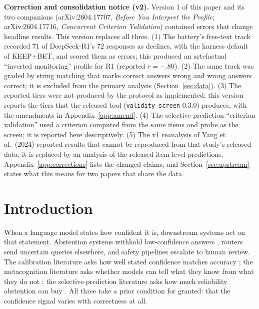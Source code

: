 \documentclass[11pt,a4paper]{article}
\begin{document}
\begin{framed}
\noindent\textbf{Correction and consolidation notice (v2).} Version 1 of this paper and its two companions (arXiv:2604.17707, \emph{Before You Interpret the Profile}; arXiv:2604.17716, \emph{Concurrent Criterion Validation}) contained errors that change headline results. This version replaces all three. (1) The battery's free-text track recorded 71 of DeepSeek-R1's 72 responses as declines, with the harness default of KEEP+BET, and scored them as errors; this produced an artefactual ``inverted monitoring'' profile for R1 (reported $r = -.80$). (2) The same track was graded by string matching that marks correct answers wrong and wrong answers correct; it is excluded from the primary analysis (Section~\ref{sec:data}). (3) The reported tiers were not produced by the protocol as implemented; this version reports the tiers that the released tool (\texttt{validity\_screen} 0.3.0) produces, with the amendments in Appendix~\ref{app:amend}. (4) The selective-prediction ``criterion validation'' used a criterion computed from the same items and probe as the screen; it is reported here descriptively. (5) The v1 reanalysis of Yang et al.\ (2024) reported results that cannot be reproduced from that study's released data; it is replaced by an analysis of the released item-level predictions. Appendix~\ref{app:corrections} lists the changed claims, and Section~\ref{sec:upstream} states what this means for two papers that share the data.
\end{framed}

\section{Introduction}

When a language model states how confident it is, downstream systems act on that statement. Abstention systems withhold low-confidence answers \citep{wen2025}, routers send uncertain queries elsewhere, and safety pipelines escalate to human review. The calibration literature asks how well stated confidence matches accuracy \citep{xiong2024,geng2024,yang2024}; the metacognition literature asks whether models can tell what they know from what they do not \citep{kadavath2022,steyvers2025}; the selective-prediction literature asks how much reliability abstention can buy \citep{geifman2017}. All three take a prior condition for granted: that the confidence signal varies with correctness at all.
\end{document}
